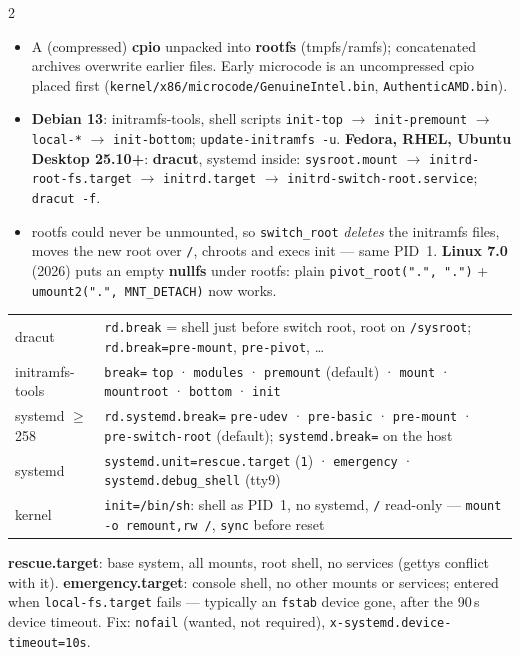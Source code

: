 \documentclass[8pt]{extarticle}
\newcommand\ct{\texttt}
\newcommand\hd[1]{\par\vspace{2pt}\noindent{\bfseries\color{sheetBlue}#1}\par\vspace{1pt}}
\begin{document}
\begin{multicols}{2}
\hd{initramfs and switch root}
\begin{itemize}
  \item A (compressed) \textbf{cpio} unpacked into \textbf{rootfs} (tmpfs/ramfs); concatenated
        archives overwrite earlier files. Early microcode is an uncompressed cpio placed first
        (\ct{kernel/x86/microcode/GenuineIntel.bin}, \ct{AuthenticAMD.bin}).
  \item \textbf{Debian 13}: initramfs-tools, shell scripts \ct{init-top} $\rightarrow$
        \ct{init-premount} $\rightarrow$ \ct{local-*} $\rightarrow$ \ct{init-bottom};
        \ct{update-initramfs -u}. \textbf{Fedora, RHEL, Ubuntu Desktop 25.10+}: \textbf{dracut},
        systemd inside: \ct{sysroot.mount} $\rightarrow$ \ct{initrd-root-fs.target} $\rightarrow$
        \ct{initrd.target} $\rightarrow$ \ct{initrd-switch-root.service}; \ct{dracut -f}.
  \item rootfs could never be unmounted, so \ct{switch\_root} \emph{deletes} the initramfs files,
        moves the new root over \ct{/}, chroots and execs init — same PID~1. \textbf{Linux 7.0}
        (2026) puts an empty \textbf{nullfs} under rootfs: plain \ct{pivot\_root(".", ".")} +
        \ct{umount2(".", MNT\_DETACH)} now works.
\end{itemize}

\hd{Breaking in}
{\scriptsize\setlength{\tabcolsep}{2pt}
\begin{tabular}{@{}>{\raggedright\arraybackslash}p{17mm}>{\raggedright\arraybackslash}p{61mm}@{}}
\toprule
dracut & \ct{rd.break} = shell just before switch root, root on \ct{/sysroot}; \ct{rd.break=pre-mount}, \ct{pre-pivot}, … \\
initramfs-tools & \ct{break=} \ct{top} · \ct{modules} · \ct{premount} (default) · \ct{mount} · \ct{mountroot} · \ct{bottom} · \ct{init} \\
systemd $\ge$ 258 & \ct{rd.systemd.break=} \ct{pre-udev} · \ct{pre-basic} · \ct{pre-mount} · \ct{pre-switch-root} (default); \ct{systemd.break=} on the host \\
systemd & \ct{systemd.unit=rescue.target} (\ct{1}) · \ct{emergency} · \ct{systemd.debug\_shell} (tty9) \\
kernel & \ct{init=/bin/sh}: shell as PID~1, no systemd, \ct{/} read-only — \ct{mount -o remount,rw /}, \ct{sync} before reset \\
\bottomrule
\end{tabular}}\par
\textbf{rescue.target}: base system, all mounts, root shell, no services (gettys conflict with
it). \textbf{emergency.target}: console shell, no other mounts or services; entered when
\ct{local-fs.target} fails — typically an \ct{fstab} device gone, after the 90\,s device timeout.
Fix: \ct{nofail} (wanted, not required), \ct{x-systemd.device-timeout=10s}.


\end{multicols}
\end{document}
